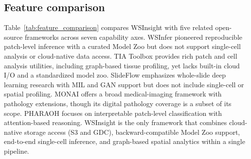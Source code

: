 \documentclass[sn-mathphys-num]{sn-jnl}%
\theoremstyle{thmstyleone}%
\theoremstyle{thmstyletwo}%
\theoremstyle{thmstylethree}%
\begin{document}
	\subsection{Feature comparison}

	Table~\ref{tab:feature_comparison} compares WSInsight with five related open-source frameworks across seven capability axes. WSInfer \cite{Kaczmarzyk:2024} pioneered reproducible patch-level inference with a curated Model Zoo but does not support single-cell analysis or cloud-native data access. TIA Toolbox \cite{Pocock:2022} provides rich patch and cell analysis utilities, including graph-based tissue profiling, yet lacks built-in cloud I/O and a standardized model zoo. SlideFlow \cite{Dolezal:2024} emphasizes whole-slide deep learning research with MIL and GAN support but does not include single-cell or spatial profiling. MONAI \cite{Cardoso:2022} offers a broad medical-imaging framework with pathology extensions, though its digital pathology coverage is a subset of its scope. PHARAOH \cite{Faust:2024} focuses on interpretable patch-level classification with attention-based reasoning. WSInsight is the only framework that combines cloud-native storage access (S3 and GDC), backward-compatible Model Zoo support, end-to-end single-cell inference, and graph-based spatial analytics within a single pipeline.
\end{document}
